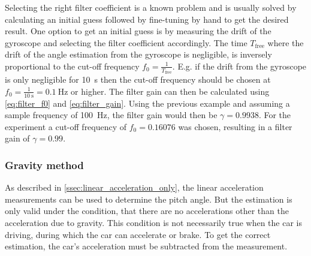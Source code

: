 Selecting the right filter coefficient is a known problem and is usually solved by calculating an initial guess followed by fine-tuning by hand to get the desired result.
One option to get an initial guess is by measuring the drift of the gyroscope and selecting the filter coefficient accordingly.
The time $T_\mathrm{free}$ where the drift of the angle estimation from the gyroscope is negligible, is inversely proportional to the cut-off frequency $f_0 = \frac{1}{T_\mathrm{free}}$.
E.g. if the drift from the gyroscope is only negligible for \SI{10}{\second} then the cut-off frequency should be chosen at $f_0 = \frac{1}{\SI{10}{\second}} = \SI{0.1}{\hertz}$ or higher.
The filter gain can then be calculated using \cref{eq:filter_f0} and \cref{eq:filter_gain}.
Using the previous example and assuming a sample frequency of \SI{100}{\hertz}, the filter gain would then be $\gamma = 0.9938$.
For the experiment a cut-off frequency of $f_0=0.16076$ was chosen, resulting in a filter gain of $\gamma = 0.99$.

\subsubsection{Gravity method}
\label{subsubsec:gravity_method}
As described in \cref{ssec:linear_acceleration_only}, the linear acceleration measurements can be used to determine the pitch angle.
But the estimation is only valid under the condition, that there are no accelerations other than the acceleration due to gravity.
This condition is not necessarily true when the car is driving, during which the car can accelerate or brake.
To get the correct estimation, the car's acceleration must be subtracted from the measurement.
